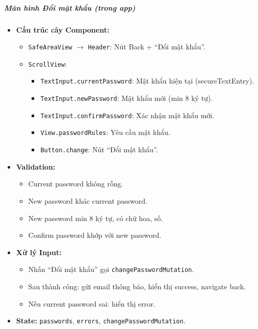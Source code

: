 \subparagraph{Màn hình Đổi mật khẩu (trong app)}
\begin{itemize}
    \item \textbf{Cấu trúc cây Component:}
        \begin{itemize}
            \item \texttt{SafeAreaView} $\rightarrow$ \texttt{Header}: Nút Back + ``Đổi mật khẩu''.
            \item \texttt{ScrollView}:
                \begin{itemize}
                    \item \texttt{TextInput.currentPassword}: Mật khẩu hiện tại (secureTextEntry).
                    \item \texttt{TextInput.newPassword}: Mật khẩu mới (min 8 ký tự).
                    \item \texttt{TextInput.confirmPassword}: Xác nhận mật khẩu mới.
                    \item \texttt{View.passwordRules}: Yêu cầu mật khẩu.
                    \item \texttt{Button.change}: Nút ``Đổi mật khẩu''.
                \end{itemize}
        \end{itemize}
    \item \textbf{Validation:}
        \begin{itemize}
            \item Current password không rỗng.
            \item New password khác current password.
            \item New password min 8 ký tự, có chữ hoa, số.
            \item Confirm password khớp với new password.
        \end{itemize}
    \item \textbf{Xử lý Input:}
        \begin{itemize}
            \item Nhấn ``Đổi mật khẩu'' gọi \texttt{changePasswordMutation}.
            \item Sau thành công: gửi email thông báo, hiển thị success, navigate back.
            \item Nếu current password sai: hiển thị error.
        \end{itemize}
    \item \textbf{State:} \texttt{passwords}, \texttt{errors}, \texttt{changePasswordMutation}.
\end{itemize}

